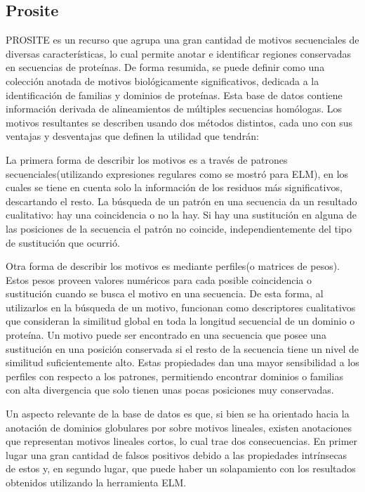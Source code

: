 

\subsection{Prosite}

PROSITE\cite{sigrist2002prosite,prositeWeb} es un recurso que agrupa una gran cantidad de motivos secuenciales de diversas características,
lo cual permite anotar e identificar regiones conservadas en secuencias de proteínas.
De forma resumida, se puede definir como una colección anotada de motivos biológicamente significativos, dedicada a la identificación de familias y dominios de proteínas.
Esta base de datos contiene información derivada de alineamientos de múltiples secuencias homólogas. 
Los motivos resultantes se describen usando dos métodos distintos, cada uno con sus ventajas y desventajas que definen la utilidad que tendrán:

La primera forma de describir los motivos es a través de patrones secuenciales(utilizando expresiones regulares como se mostró para ELM),
en los cuales se tiene en cuenta solo la información de los residuos más significativos, descartando el resto. 
La búsqueda de un patrón en una secuencia da un resultado cualitativo: hay una coincidencia o no la hay. 
Si hay una sustitución en alguna de las posiciones de la secuencia el patrón no coincide, independientemente del tipo de sustitución que ocurrió.

Otra forma de describir los motivos es mediante perfiles(o matrices de pesos). Estos pesos proveen valores numéricos para cada posible coincidencia o sustitución cuando se busca el motivo en una secuencia. 
De esta forma, al utilizarlos en la búsqueda de un motivo, funcionan como descriptores cualitativos que consideran la similitud global en toda la longitud secuencial de un dominio o proteína. 
Un motivo puede ser encontrado en una secuencia que posee una sustitución en una posición conservada si el resto de la secuencia tiene un nivel de similitud suficientemente alto.
Estas propiedades dan una mayor sensibilidad a los perfiles con respecto a los patrones, permitiendo encontrar dominios o familias con alta divergencia que solo tienen unas pocas posiciones muy conservadas.

Un aspecto relevante de la base de datos es que, si bien se ha orientado hacia la anotación de dominios globulares por sobre motivos lineales, existen anotaciones que representan motivos lineales cortos, lo cual trae dos consecuencias. 
En primer lugar una gran cantidad de falsos positivos debido a las propiedades intrínsecas de estos y, en segundo lugar, que puede haber un solapamiento con los resultados obtenidos utilizando la herramienta ELM.

